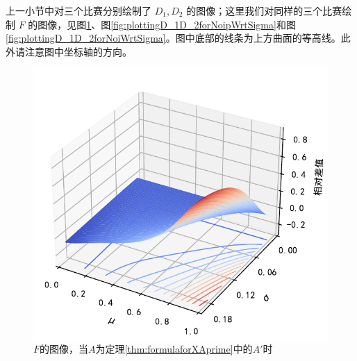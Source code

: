             \vspace{1.5ex}

            上一小节中对三个比赛分别绘制了 $D_1,D_2$ 的图像；这里我们对同样的三个比赛绘制 $F$ 的图像，见图\ref{fig:plottingD_1D_2forAprimeWrtSigma}、图\ref{fig:plottingD_1D_2forNoipWrtSigma}和图\ref{fig:plottingD_1D_2forNoiWrtSigma}。图中底部的线条为上方曲面的等高线。此外请注意图中坐标轴的方向。

            \begin{figure}[hp]
                \centering
                \includegraphics[width=\textwidth]{fig/plottingD_1D_2WrtSigma.pdf}
                \caption{$F$的图像，当$A$为定理\ref{thm:formulaforXAprime}中的$A'$时}
                \label{fig:plottingD_1D_2forAprimeWrtSigma}
            \end{figure}

